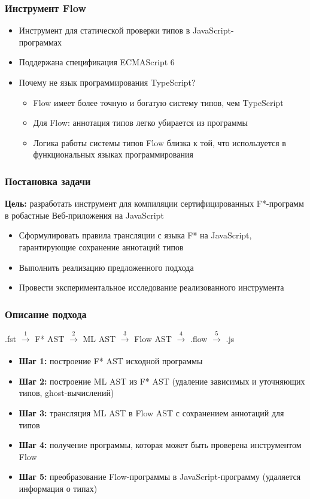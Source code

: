\documentclass{beamer}
\begin{document}
\begin{frame}
\transwipe[direction=90]
\frametitle{Инструмент Flow}
\begin{itemize}
\item Инструмент для статической проверки типов в JavaScript-\\программах
\item Поддержана спецификация ECMAScript 6
\item Почему не язык программирования TypeScript?
	\begin{itemize}
	\item Flow имеет более точную и богатую систему типов, чем TypeScript
	\item Для Flow: аннотация типов легко убирается из программы
	\item Логика работы системы типов Flow близка к той, что используется в функциональных языках программирования
	\end{itemize}			
\end{itemize}
\end{frame}


\begin{frame}
\transwipe[direction=90]
\frametitle{Постановка задачи}

\textbf{Цель:} разработать инструмент для компиляции сертифицированных F*-программ в робастные Веб-приложения на JavaScript

\begin{itemize}
\item Сформулировать правила трансляции с языка F* на JavaScript, гарантирующие сохранение аннотаций типов
\item Выполнить реализацию предложенного подхода
\item Провести экспериментальное исследование реализованного инструмента
\end{itemize}
\end{frame}


\begin{frame}
\transwipe[direction=90]
\frametitle{Описание подхода}

\begin{center}
.fst $\xrightarrow[]{~1~}$ F* AST  $\xrightarrow[]{~2~}$ ML AST $\xrightarrow[]{~3~}$ Flow AST $\xrightarrow[]{~4~}$ .flow $\xrightarrow[]{~5~}$ .js
\end{center}

\begin{itemize}
\item \textbf{Шаг 1:} построение F* AST исходной программы
\item \textbf{Шаг 2:} построение ML AST из F* AST (удаление зависимых и уточняющих типов, ghost-вычислений)
\item \textbf{Шаг 3:} трансляция ML AST в Flow AST с сохранением аннотаций для типов
\item \textbf{Шаг 4:} получение программы, которая может быть проверена инструментом Flow
\item \textbf{Шаг 5:} преобразование Flow-программы в JavaScript-программу (удаляется информация о типах)
\end{itemize}
    
\end{frame}
\end{document}

